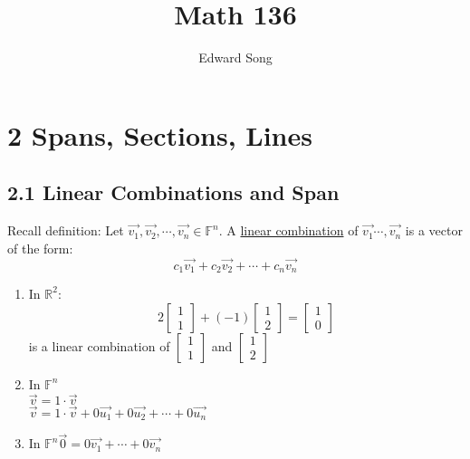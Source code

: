 \documentclass[11pt]{article}
\title{Math 136}
\author{Edward Song}
\theoremstyle{plain}
\theoremstyle{remark}
\theoremstyle{plain}
\newcommand{\rn}{\mathbb{R}}
\begin{document}
\section*{2 Spans, Sections, Lines}


   

\subsection*{2.1 Linear Combinations and Span}

\begin{tcolorbox}[colback=red!5!white,colframe=red!75!black,title=Definition: Recall]
   Recall definition: Let $\overrightarrow{v_1}, \overrightarrow{v_2}, \cdots, \overrightarrow{v_n}\in \mathbb{F}^n$. A \underline{linear combination} of 
   $\overrightarrow{v_1}\cdots, \overrightarrow{v_n}$ is a vector of the form:
   \[c_1\overrightarrow{v_1}+c_2\overrightarrow{v_2}+\cdots+c_n\overrightarrow{v_n}\]
\end{tcolorbox}   

\begin{tcolorbox}[colback=magenta!5!white,colframe=magenta!75!black,title=Problem 1 ]
    \begin{enumerate}
        \item In $\rn^2$: \[2\begin{bmatrix}
            1\\1
        \end{bmatrix}+(-1)\begin{bmatrix}
            1\\2
        \end{bmatrix}=\begin{bmatrix}
            1\\0
        \end{bmatrix}\] is a linear combination of $\begin{bmatrix}
            1\\1
        \end{bmatrix}$ and $\begin{bmatrix}
            1\\2
        \end{bmatrix}$
        \item In $\mathbb{F}^n$\\
         $\overrightarrow{v} = 1\cdot \overrightarrow{v}$ \\
         $\overrightarrow{v}=1\cdot\overrightarrow{v}+0\overrightarrow{u_1}+0\overrightarrow{u_2}+\cdots+0\overrightarrow{u_n}$
        \item In $\mathbb{F}^n \overrightarrow{0} = 0\overrightarrow{v_1}+\cdots+0\overrightarrow{v_n}$
        
    \end{enumerate}
\end{tcolorbox}   
\end{document}
